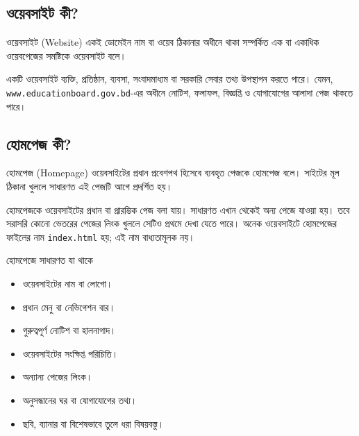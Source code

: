 \subsection{ওয়েবসাইট কী?}
\begin{definitionbox}{ওয়েবসাইট (Website)}
একই ডোমেইন নাম বা ওয়েব ঠিকানার অধীনে থাকা সম্পর্কিত এক বা একাধিক ওয়েবপেজের সমষ্টিকে ওয়েবসাইট বলে।
\end{definitionbox}
একটি ওয়েবসাইট ব্যক্তি, প্রতিষ্ঠান, ব্যবসা, সংবাদমাধ্যম বা সরকারি সেবার তথ্য উপস্থাপন করতে পারে। যেমন, \texttt{www.educationboard.gov.bd}-এর অধীনে নোটিশ, ফলাফল, বিজ্ঞপ্তি ও যোগাযোগের আলাদা পেজ থাকতে পারে।

\subsection{হোমপেজ কী?}

\begin{definitionbox}{হোমপেজ (Homepage)}
ওয়েবসাইটের প্রধান প্রবেশপথ হিসেবে ব্যবহৃত পেজকে হোমপেজ বলে। সাইটের মূল ঠিকানা খুললে সাধারণত এই পেজটি আগে প্রদর্শিত হয়।
\end{definitionbox}

হোমপেজকে ওয়েবসাইটের প্রধান বা প্রারম্ভিক পেজ বলা যায়। সাধারণত এখান থেকেই অন্য পেজে যাওয়া হয়। তবে সরাসরি কোনো ভেতরের পেজের লিংক খুললে সেটিও প্রথমে দেখা যেতে পারে। অনেক ওয়েবসাইটে হোমপেজের ফাইলের নাম \texttt{index.html} হয়; এই নাম বাধ্যতামূলক নয়।

\begin{keypointbox}{হোমপেজে সাধারণত যা থাকে}
\par\noindent
\begin{minipage}[t]{.48\linewidth}\vspace{0pt}
\begin{itemize}
\item ওয়েবসাইটের নাম বা লোগো।
\item প্রধান মেনু বা নেভিগেশন বার।
\item গুরুত্বপূর্ণ নোটিশ বা হালনাগাদ।
\item ওয়েবসাইটের সংক্ষিপ্ত পরিচিতি।
\end{itemize}
\end{minipage}\hfill
\begin{minipage}[t]{.48\linewidth}\vspace{0pt}
\begin{itemize}
\item অন্যান্য পেজের লিংক।
\item অনুসন্ধানের ঘর বা যোগাযোগের তথ্য।
\item ছবি, ব্যানার বা বিশেষভাবে তুলে ধরা বিষয়বস্তু।
\end{itemize}
\end{minipage}\par

\end{keypointbox}

